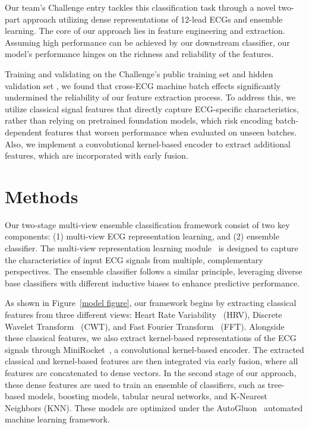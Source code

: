 \documentclass[twocolumn]{cinc}
\begin{document}
Our team's Challenge entry tackles this classification task through a novel two-part approach utilizing dense representations of 12-lead ECGs and ensemble learning. The core of our approach lies in feature engineering and extraction. Assuming high performance can be achieved by our downstream classifier, our model’s performance hinges on the richness and reliability of the features. 

Training and validating on the Challenge's public training set and hidden validation set \cite{CODE-15, SaMi-Trop, PTB-XL, REDS-II, ELSA-Brasil}, we found that cross-ECG machine batch effects significantly undermined the reliability of our feature extraction process. To address this, we utilize classical signal features that directly capture ECG-specific characteristics, rather than relying on pretrained foundation models, which risk encoding batch-dependent features that worsen performance when evaluated on unseen batches. Also, we implement a convolutional kernel-based encoder to extract additional features, which are incorporated with early fusion.


\section{Methods}
Our two-stage multi-view ensemble classification framework consist of two key components: (1) multi-view ECG representation learning, and (2) ensemble classifier. The multi-view representation learning module~\cite{Kataria2025PPGFMCA} is designed to capture the characteristics of input ECG signals from multiple, complementary perspectives. The ensemble classifier follows a similar principle, leveraging diverse base classifiers with different inductive biases to enhance predictive performance.

As shown in Figure~\ref{model figure}, our framework begins by extracting classical features from three different views: Heart Rate Variability~\cite{hrv} (HRV), Discrete Wavelet Transform~\cite{wavelet} (CWT), and Fast Fourier Transform~\cite{fft} (FFT). Alongside these classical features, we also extract kernel-based representations of the ECG signals through MiniRocket~\cite{minirocket}, a convolutional kernel-based encoder. The extracted classical and kernel-based features are then integrated via early fusion, where all features are concatenated to dense vectors. In the second stage of our approach, these dense features are used to train an ensemble of classifiers, such as tree-based models, boosting models, tabular neural networks, and K-Nearest Neighbors (KNN). These models are optimized under the AutoGluon~\cite{autogluon} automated machine learning framework.
\end{document}
